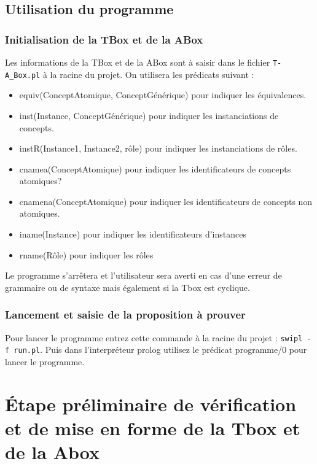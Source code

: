 \documentclass{article}
\begin{document}
\subsection{Utilisation du programme}
\subsubsection{Initialisation de la TBox et de la ABox}
Les informations de la TBox et de la ABox sont à saisir dans le fichier \verb|T-A_Box.pl| à la racine du projet. On utilisera les prédicats suivant : \begin{itemize}
    \item \color{blue} equiv(ConceptAtomique, ConceptGénérique) \color{black} pour indiquer les équivalences.
    \item \color{blue} inst(Instance, ConceptGénérique) \color{black} pour indiquer les instanciations de concepts. 
    \item \color{blue} instR(Instance1, Instance2, rôle) \color{black} pour indiquer les instanciations de rôles.
    \item \color{blue} cnamea(ConceptAtomique) \color{black} pour indiquer les identificateurs de concepts atomiques?
    \item \color{blue} cnamena(ConceptAtomique) \color{black} pour indiquer les identificateurs de concepts non atomiques.
    \item \color{blue} iname(Instance) \color{black} pour indiquer les identificateurs d'instances
    \item \color{blue} rname(Rôle) \color{black} pour indiquer les rôles
\end{itemize}
Le programme s'arrêtera et l'utilisateur sera averti en cas d'une erreur de grammaire ou de syntaxe mais également si la Tbox est cyclique.

\subsubsection{Lancement et saisie de la proposition à prouver}
Pour lancer le programme entrez cette commande à la racine du projet : \verb|swipl -f run.pl|. Puis dans l'interpréteur prolog utilisez le prédicat \color{blue} programme/0 \color{black} pour lancer le programme.

\section{\'Etape préliminaire de vérification et de mise en forme de la Tbox et de la Abox}
\end{document}
